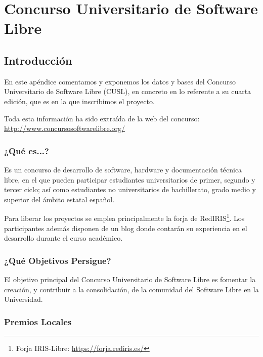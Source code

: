 \chapter{Concurso Universitario de Software Libre} \label{ap2}

\vspace*{5mm}

\section{Introducción}

En este apéndice comentamos y exponemos los datos y bases del Concurso
Universitario de Software Libre (CUSL), en concreto en lo referente a su cuarta
edición, que es en la que inscribimos el proyecto.

Toda esta información ha sido extraída de la web del concurso:\\
\url{http://www.concursosoftwarelibre.org/}

\subsection{¿Qué es...?}

Es un concurso de desarrollo de software, hardware y documentación técnica
libre, en el que pueden participar estudiantes universitarios de primer,
segundo y tercer ciclo; así como estudiantes no universitarios de bachillerato,
grado medio y superior del ámbito estatal español.

Para liberar los proyectos se emplea principalmente la forja de
RedIRIS\footnote{Forja IRIS-Libre: \url{https://forja.rediris.es/}}. Los
participantes además disponen de un blog donde contarán su experiencia en el
desarrollo durante el curso académico.

\subsection{¿Qué Objetivos Persigue?}

El objetivo principal del Concurso Universitario de Software Libre es fomentar
la creación, y contribuir a la consolidación, de la comunidad del Software Libre
en la Universidad.

\subsection{Premios Locales}

